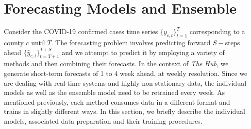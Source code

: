 \documentclass[sigconf]{acmart}
\newcommand{\hub}{\emph{The Hub}}
\begin{document}
\section{Forecasting Models and Ensemble}
\label{sec:models}
Consider the COVID-19 confirmed cases time series $\{y_{c,t}\}_{t=1}^{T}$ corresponding to a county $c$ until $T$. The forecasting problem involves predicting forward $S-$steps ahead $\{\hat{y}_{c,t}\}_{t=T+1}^{T+S}$ and we attempt to predict it by employing a variety of methods and then combining their forecasts. In the context of \hub{}, we generate short-term forecasts of 1 to 4 week ahead, at weekly resolution. Since we are dealing with real-time systems and highly non-stationary data, the individual models as well as the ensemble model need to be retrained every week. As mentioned previously, each method consumes data in a different format and trains in slightly different ways. In this section, we briefly describe the individual models, associated data preparation and their training procedures. 
\end{document}
